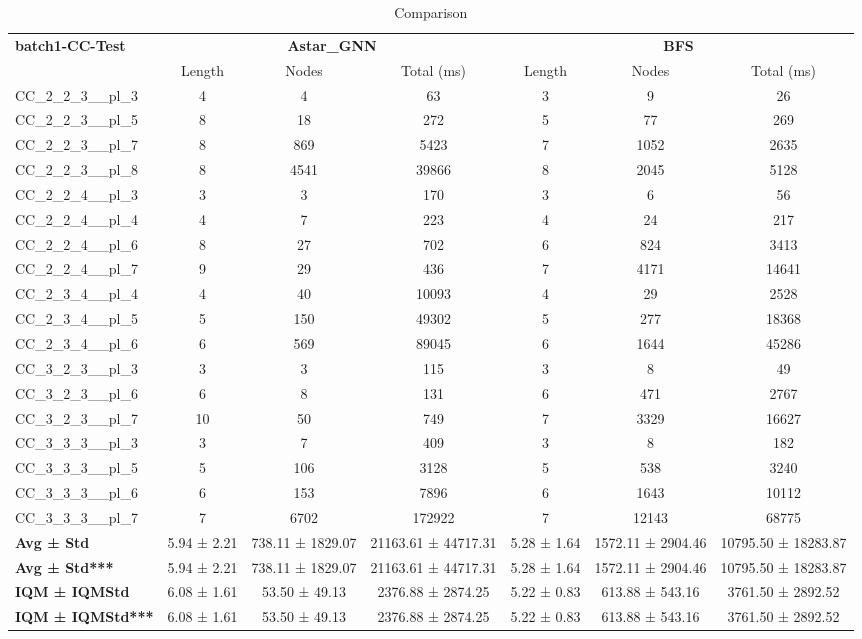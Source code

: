 \begin{table}[!ht]
\centering
\small
\begin{tabular}{l|ccc|ccc}
\multirow{2}{*}{\textbf{batch1-CC-Test}} & \multicolumn{3}{c|}{\textbf{Astar\_GNN}} & \multicolumn{3}{c}{\textbf{BFS}} \\
\cline{2-7}
& Length & Nodes & Total (ms) & Length & Nodes & Total (ms) \\
\hline
CC\_2\_2\_3\_\_pl\_3 & 4 & 4 & 63 & 3 & 9 & 26 \\
CC\_2\_2\_3\_\_pl\_5 & 8 & 18 & 272 & 5 & 77 & 269 \\
CC\_2\_2\_3\_\_pl\_7 & 8 & 869 & 5423 & 7 & 1052 & 2635 \\
CC\_2\_2\_3\_\_pl\_8 & 8 & 4541 & 39866 & 8 & 2045 & 5128 \\
CC\_2\_2\_4\_\_pl\_3 & 3 & 3 & 170 & 3 & 6 & 56 \\
CC\_2\_2\_4\_\_pl\_4 & 4 & 7 & 223 & 4 & 24 & 217 \\
CC\_2\_2\_4\_\_pl\_6 & 8 & 27 & 702 & 6 & 824 & 3413 \\
CC\_2\_2\_4\_\_pl\_7 & 9 & 29 & 436 & 7 & 4171 & 14641 \\
CC\_2\_3\_4\_\_pl\_4 & 4 & 40 & 10093 & 4 & 29 & 2528 \\
CC\_2\_3\_4\_\_pl\_5 & 5 & 150 & 49302 & 5 & 277 & 18368 \\
CC\_2\_3\_4\_\_pl\_6 & 6 & 569 & 89045 & 6 & 1644 & 45286 \\
CC\_3\_2\_3\_\_pl\_3 & 3 & 3 & 115 & 3 & 8 & 49 \\
CC\_3\_2\_3\_\_pl\_6 & 6 & 8 & 131 & 6 & 471 & 2767 \\
CC\_3\_2\_3\_\_pl\_7 & 10 & 50 & 749 & 7 & 3329 & 16627 \\
CC\_3\_3\_3\_\_pl\_3 & 3 & 7 & 409 & 3 & 8 & 182 \\
CC\_3\_3\_3\_\_pl\_5 & 5 & 106 & 3128 & 5 & 538 & 3240 \\
CC\_3\_3\_3\_\_pl\_6 & 6 & 153 & 7896 & 6 & 1643 & 10112 \\
CC\_3\_3\_3\_\_pl\_7 & 7 & 6702 & 172922 & 7 & 12143 & 68775 \\
\hline
\textbf{Avg ± Std} & 5.94 ± 2.21 & 738.11 ± 1829.07 & 21163.61 ± 44717.31 & 5.28 ± 1.64 & 1572.11 ± 2904.46 & 10795.50 ± 18283.87 \\
\textbf{Avg ± Std***} & 5.94 ± 2.21 & 738.11 ± 1829.07 & 21163.61 ± 44717.31 & 5.28 ± 1.64 & 1572.11 ± 2904.46 & 10795.50 ± 18283.87 \\
\textbf{IQM ± IQMStd} & 6.08 ± 1.61 & 53.50 ± 49.13 & 2376.88 ± 2874.25 & 5.22 ± 0.83 & 613.88 ± 543.16 & 3761.50 ± 2892.52 \\
\textbf{IQM ± IQMStd***} & 6.08 ± 1.61 & 53.50 ± 49.13 & 2376.88 ± 2874.25 & 5.22 ± 0.83 & 613.88 ± 543.16 & 3761.50 ± 2892.52 \\
\end{tabular}
\caption{Comparison}
\label{tab:batch1_CC_comparison_test}
\end{table}
